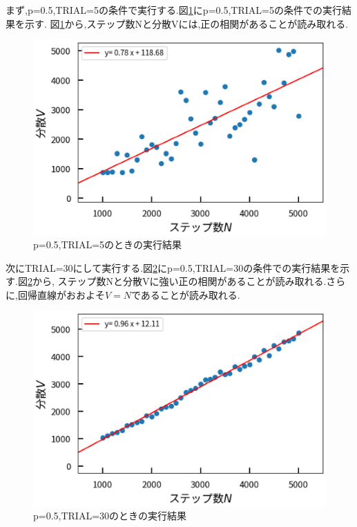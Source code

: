 \documentclass[a4j]{jarticle}
\begin{document}
      まず,p=0.5,TRIAL=5の条件で実行する.図\ref{t5}にp=0.5,TRIAL=5の条件での実行結果を示す.
      図\ref{t5}から,ステップ数Nと分散Vには,正の相関があることが読み取れる.

      \begin{figure}[H]
        \centering
        \includegraphics[scale=0.6]{t5.eps}
        \caption{p=0.5,TRIAL=5のときの実行結果}
        \label{t5}
        \end{figure}

        次にTRIAL=30にして実行する.図\ref{t30}にp=0.5,TRIAL=30の条件での実行結果を示す.図\ref{t30}から,
        ステップ数Nと分散Vに強い正の相関があることが読み取れる.さらに,回帰直線がおおよそ$V=N$であることが読み取れる.

        \begin{figure}[H]
            \centering
            \includegraphics[scale=0.6]{t30.eps}
            \caption{p=0.5,TRIAL=30のときの実行結果}
            \label{t30}
            \end{figure}       
\end{document}
